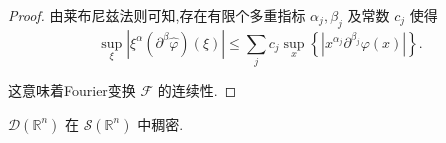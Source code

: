 \documentclass[lang=cn,newtx,10pt,scheme=chinese,thmcnt=chapter]{elegantbook}
\begin{document}
\begin{proof}
由莱布尼兹法则可知,存在有限个多重指标 \({\alpha }_{j},{\beta }_{j}\) 及常数 \({c}_{j}\) 使得
\begin{equation*}
\mathop{\sup }\limits_{\xi }\left| {{\xi }^{\alpha }\left( {{\partial }^{\beta }\widehat{\varphi }}\right) \left( \xi \right) }\right|  \leqslant  \mathop{\sum }\limits_{j}{c}_{j}\mathop{\sup }\limits_{x}\left\{  \left| {{x}^{{\alpha }_{j}}{\partial }^{{\beta }_{j}}\varphi \left( x\right) }\right| \right\}  .
\end{equation*}

这意味着Fourier变换 \(\mathcal{F}\) 的连续性.

\end{proof}
\begin{proposition}
 \( \mathcal{D}\left( {\mathbb{R}}^{n}\right) \) 在 \( \mathcal{S}\left( {\mathbb{R}}^{n}\right) \) 中稠密.
\end{proposition}
\end{document}
